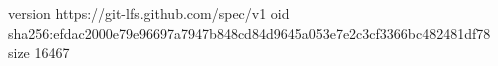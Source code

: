 version https://git-lfs.github.com/spec/v1
oid sha256:efdac2000e79e96697a7947b848cd84d9645a053e7e2c3cf3366bc482481df78
size 16467
